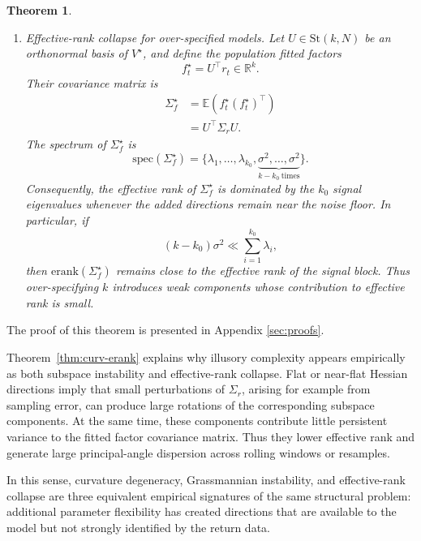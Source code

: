 \documentclass[11pt,letterpaper]{article}
\newcommand{\erank}{\mathrm{erank}}
\newcommand{\bR}{\mathbb{R}}
\newtheorem{theorem}{Theorem}[section]
\begin{document}
\begin{theorem}
\begin{enumerate}[label=(\roman*)]
\item \emph{Effective-rank collapse for over-specified models.}
Let $U\in\mathrm{St}(k,N)$ be an orthonormal basis of $V^\star$, and define the population fitted factors
\begin{equation}
\label{eq:pop-factors}
f_t^\star = U^\top r_t \in\bR^k.
\end{equation}
Their covariance matrix is
\begin{equation}
\label{eq:pop-factor-covariance}
\begin{split}
\Sigma_f^\star
&=\mathbb{E}(f_t^\star(f_t^\star)^\top)\\
&=U^\top\Sigma_r U.
\end{split}
\end{equation}
The spectrum of $\Sigma_f^\star$ is
\begin{equation}
\label{eq:pop-factor-spectrum}
\mathrm{spec}(\Sigma_f^\star)=\{\lambda_1,\ldots,\lambda_{k_0}, \underbrace{\sigma^2,\ldots,\sigma^2}_{k-k_0\ \mathrm{times}}\}.
\end{equation}
Consequently, the effective rank of $\Sigma_f^\star$ is dominated by the $k_0$ signal eigenvalues whenever the added directions remain near the noise floor. In particular, if
\begin{equation*}
(k-k_0)\sigma^2
\ll
\sum_{i=1}^{k_0}\lambda_i,
\end{equation*}
then $\erank(\Sigma_f^\star)$ remains close to the effective rank of the signal block. Thus over-specifying $k$ introduces weak components whose contribution to effective rank is small.
\end{enumerate}
\end{theorem}

\smallskip\noindent
The proof of this theorem is presented in Appendix \ref{sec:proofs}.

Theorem~\ref{thm:curv-erank} explains why illusory complexity appears empirically as both subspace instability and effective-rank collapse. Flat or near-flat Hessian directions imply that small perturbations of $\Sigma_r$, arising for example from sampling error, can produce large rotations of the corresponding subspace components. At the same time, these components contribute little persistent variance to the fitted factor covariance matrix. Thus they lower effective rank and generate large principal-angle dispersion across rolling windows or resamples.

In this sense, curvature degeneracy, Grassmannian instability, and effective-rank collapse are three equivalent empirical signatures of the same structural problem: additional parameter flexibility has created directions that are available to the model but not strongly identified by the return data.
\end{document}
